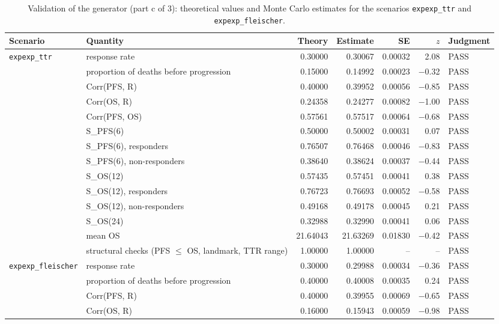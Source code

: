 \begin{table}[htbp]
\centering
\caption{Validation of the generator (part c of 3): theoretical values and Monte Carlo estimates for the scenarios \texttt{expexp\_ttr} and \texttt{expexp\_fleischer}.}
\label{tab:generatorc}
\begin{threeparttable}
\scriptsize\setlength{\tabcolsep}{3pt}
\begin{tabular}{p{2.4cm}p{4.2cm}rrrrl}
\toprule
Scenario & Quantity & Theory & Estimate & SE & $z$ & Judgment \\
\midrule
\texttt{expexp\_ttr} & response rate & 0.30000 & 0.30067 & 0.00032 & 2.08 & PASS \\
 & proportion of deaths before progression & 0.15000 & 0.14992 & 0.00023 & $-$0.32 & PASS \\
 & Corr(PFS, R) & 0.40000 & 0.39952 & 0.00056 & $-$0.85 & PASS \\
 & Corr(OS, R) & 0.24358 & 0.24277 & 0.00082 & $-$1.00 & PASS \\
 & Corr(PFS, OS) & 0.57561 & 0.57517 & 0.00064 & $-$0.68 & PASS \\
 & S\_PFS(6) & 0.50000 & 0.50002 & 0.00031 & 0.07 & PASS \\
 & S\_PFS(6), responders & 0.76507 & 0.76468 & 0.00046 & $-$0.83 & PASS \\
 & S\_PFS(6), non-responders & 0.38640 & 0.38624 & 0.00037 & $-$0.44 & PASS \\
 & S\_OS(12) & 0.57435 & 0.57451 & 0.00041 & 0.38 & PASS \\
 & S\_OS(12), responders & 0.76723 & 0.76693 & 0.00052 & $-$0.58 & PASS \\
 & S\_OS(12), non-responders & 0.49168 & 0.49178 & 0.00045 & 0.21 & PASS \\
 & S\_OS(24) & 0.32988 & 0.32990 & 0.00041 & 0.06 & PASS \\
 & mean OS & 21.64043 & 21.63269 & 0.01830 & $-$0.42 & PASS \\
 & structural checks (PFS $\le$ OS, landmark, TTR range) & 1.00000 & 1.00000 & -- & -- & PASS \\
\midrule
\texttt{expexp\_fleischer} & response rate & 0.30000 & 0.29988 & 0.00034 & $-$0.36 & PASS \\
 & proportion of deaths before progression & 0.40000 & 0.40008 & 0.00035 & 0.24 & PASS \\
 & Corr(PFS, R) & 0.40000 & 0.39955 & 0.00069 & $-$0.65 & PASS \\
 & Corr(OS, R) & 0.16000 & 0.15943 & 0.00059 & $-$0.98 & PASS \\

\end{tabular}
\end{threeparttable}
\end{table}
